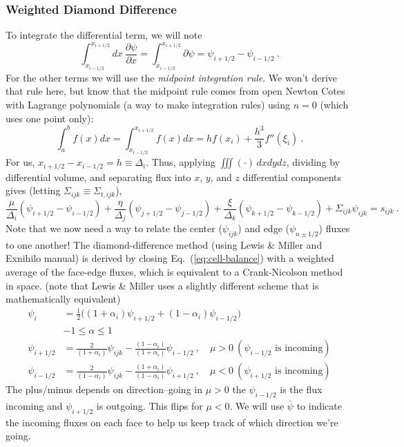 \documentclass[12pt]{article}
\newcommand{\Di}{\ensuremath{\Delta_i}}
\newcommand{\Dj}{\ensuremath{\Delta_j}}
\newcommand{\Dk}{\ensuremath{\Delta_k}}
\begin{document}
\subsubsection*{Weighted Diamond Difference}
To integrate the differential term, we will note
\[
\int_{x_{i-1/2}}^{x_{i+1/2}} dx \:\frac{\partial \psi}{\partial x}  = \int_{x_{i-1/2}}^{x_{i+1/2}} \partial \psi = \psi_{i+1/2} - \psi_{i-1/2} \:.
\]
For the other terms we will use the \textit{midpoint integration rule}. We won't derive that rule here, but know that the midpoint rule comes from open Newton Cotes with Lagrange polynomials (a way to make integration rules) using $n=0$ (which uses one point only):
\[\int_a^b f(x)dx = \int_{x_{i-1/2}}^{x_{i+1/2}} f(x)dx = hf(x_i) + \frac{h^3}{3}f''(\xi_i)\:.\]
For us, $x_{i+1/2} - x_{i-1/2} = h \equiv \Di$. Thus, applying $\iiint(\cdot)\,dxdydz$, dividing by differential volume, and separating flux into $x$, $y$, and $z$ differential components gives (letting $\Sigma_{ijk} \equiv \Sigma_{t,ijk}$),
\begin{equation}
  \frac{\mu}{\Delta_i}(\psi_{i+1/2}-\psi_{i-1/2}) +
  \frac{\eta}{\Dj}(\psi_{j+1/2}-\psi_{j-1/2}) +
  \frac{\xi}{\Dk}(\psi_{k+1/2}-\psi_{k-1/2}) + \Sigma_{ijk}\psi_{ijk} = s_{ijk}\:.
  \label{eq:cell-balance}
\end{equation}
Note that we now need a way to relate the center ($\psi_{ijk}$) and edge ($\psi_{n\pm 1/2}$) fluxes to one another!
The diamond-difference method (using Lewis \& Miller and Exnihilo manual) is derived by closing
Eq.~(\ref{eq:cell-balance}) with a weighted average of the face-edge fluxes, which is
equivalent to a Crank-Nicolson method in space. 
(note that Lewis \& Miller uses a slightly different scheme that is mathematically equivalent)
\begin{align*}
\psi_{i} &= \frac{1}{2}\bigl((1+\alpha_i)\psi_{i+1/2}+(1-\alpha_i)\psi_{i-1/2}\bigr)\\
& -1 \leq \alpha \leq 1\\
\psi_{i+1/2} &= \frac{2}{(1+\alpha_i)}\psi_{ijk}-
    \frac{(1-\alpha_i)}{(1+\alpha_i)}\psi_{i-1/2}\:,\quad \mu>0\:(\psi_{i-1/2}\text{ is incoming})\\
\psi_{i-1/2} &= \frac{2}{(1-\alpha_i)}\psi_{ijk}-
    \frac{(1+\alpha_i)}{(1-\alpha_i)}\psi_{i+1/2}\:,\quad \mu<0 \:(\psi_{i+1/2}\text{ is incoming})
\end{align*}
The plus/minus depends on direction--going in $\mu>0$ the $\psi_{i-1/2}$ is the flux incoming and $\psi_{i+1/2}$ is outgoing. This flips for $\mu<0$. We will use $\bar{\psi}$ to indicate the incoming fluxes on each face to help us keep track of which direction we're going.
\end{document}
